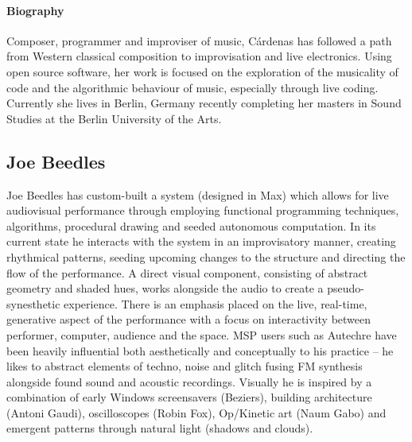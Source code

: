 \documentclass[sigplan,10pt]{acmart}\settopmatter{}
\begin{document}
\paragraph{Biography} Composer, programmer and improviser of music, C\'{a}rdenas has
followed a path from Western classical composition to improvisation
and live electronics. Using open source software, her work is focused
on the exploration of the musicality of code and the algorithmic
behaviour of music, especially through live coding. Currently she
lives in Berlin, Germany recently completing her masters in Sound
Studies at the Berlin University of the Arts.

\subsection{Joe Beedles}

Joe Beedles has custom-built a 
system (designed in Max) which allows for live audiovisual performance
through employing functional programming techniques, algorithms,
procedural drawing and seeded autonomous computation. In its current
state he interacts with the system in an improvisatory manner, creating
rhythmical patterns, seeding upcoming changes to the structure and
directing the flow of the performance. A direct visual component,
consisting of abstract geometry and shaded hues, works alongside the
audio to create a pseudo-synesthetic experience. There is an emphasis
placed on the live, real-time, generative aspect of the performance
with a focus on interactivity between performer, computer, audience
and the space. MSP users such as Autechre have been heavily
influential both aesthetically and conceptually to his practice -- he
likes to abstract elements of techno, noise and glitch fusing FM
synthesis alongside found sound and acoustic recordings. Visually he is
inspired by a combination of early Windows screensavers (Beziers),
building architecture (Antoni Gaudi), oscilloscopes (Robin Fox),
Op/Kinetic art (Naum Gabo) and emergent patterns through natural light
(shadows and clouds).
\end{document}
